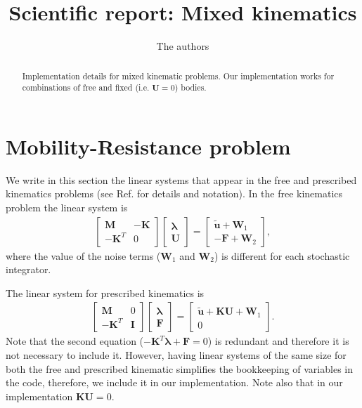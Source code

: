 \documentclass[a4paper,12pt,twoside]{revtex4}
\newcommand{\eqn}{\begin{eqnarray}}
\newcommand{\eqnend}{\end{eqnarray}}
\newcommand{\bs}[1]{\boldsymbol{#1}}
\newcommand{\wtil}[1]{\widetilde{#1}}
\def\bF{\bs{F}}
\def\bI{\bs{I}}
\def\bK{\bs{K}}
\def\bM{\bs{M}}
\def\bu{\bs{u}}
\def\bU{\bs{U}}
\def\bW{\bs{W}}
\def\blambda{\bs{\lambda}}
\begin{document}
\title{Scientific report: Mixed kinematics}
\author{The authors}
\begin{abstract}
  Implementation details for mixed kinematic problems. Our implementation works for combinations of free and fixed
  (i.e. $\bU=0$) bodies. 
\end{abstract}

\maketitle





\section{Mobility-Resistance problem}
We write in this section the linear systems that appear in the free and prescribed kinematics problems (see Ref. \cite{Usabiaga2016} for details and notation). In the free kinematics problem the linear system is
\eqn
\left[ \begin{array}{cc}
\bM & -\bK \\
-\bK^T & 0
\end{array}\right] 
\left[ \begin{array}{c}
\blambda \\
\bU
\end{array}\right] = 
\left[ \begin{array}{c}
\wtil{\bu} + \bW_1 \\
-\bF + \bW_2
\end{array}\right],
\label{eq:free}
\eqnend
where the value of the noise terms ($\bW_1$ and $\bW_2$) is different for each stochastic integrator.

The linear system for prescribed kinematics is
\eqn
\left[ \begin{array}{cc}
\bM & 0 \\
-\bK^T & \bI
\end{array}\right] 
\left[ \begin{array}{c}
\blambda \\
\bF
\end{array}\right] = 
\left[ \begin{array}{c}
\wtil{\bu} + \bK \bU + \bW_1 \\
0
\end{array}\right].
\label{eq:prescribed}
\eqnend
Note that the second equation ($-\bK^T \blambda + \bF = 0$) is redundant and therefore it is not necessary to include it. However,
having linear systems of the same size for both the free and prescribed kinematic simplifies the bookkeeping of variables in the code, therefore, we include it in our implementation.
Note also that in our implementation $\bK \bU=0$.
\end{document}
